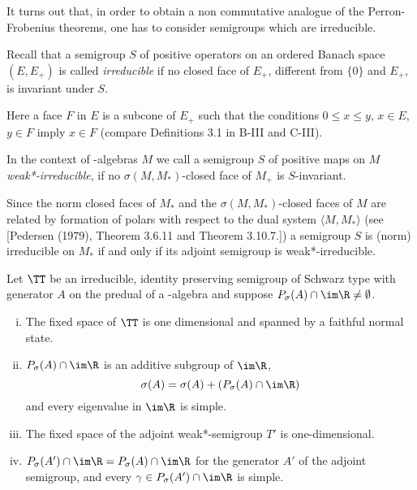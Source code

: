 It turns out that, in order to obtain a non commutative analogue of the Perron-Frobenius theorems, one has to consider semigroups which are irreducible.

Recall that a semigroup $S$ of positive operators on an ordered Banach space $(E,E_{+})$ is called \emph{irreducible} if no closed face of $E_{+}$, different from $\{0\}$ and $E_{+}$, is invariant under $S$.

Here a face $F$ in $E$ is a subcone of $E_{+}$ such that the conditions $0 \leq x \leq y$, $x \in E$, $y \in F$ imply $x \in F$ (compare Definitions 3.1 in B-III and C-III).

In the context of \WA-algebras $M$ we call a semigroup $S$ of positive maps on $M$ \emph{weak*-irreducible}, if no $\sigma(M,M_{*})$-closed face of $M_{+}$ is $S$-invariant.

Since the norm closed faces of $M_{*}$ and the $\sigma(M,M_{*})$-closed faces of $M$ are related by formation of polars with respect to the dual system $\langle M,M_{*} \rangle$ (see [Pedersen (1979), Theorem 3.6.11 and Theorem 3.10.7.]) a semigroup $S$ is (norm) irreducible on $M_{*}$ if and only if its adjoint semigroup is weak*-irreducible.

\begin{theorem}\label{thm:d3-1.10}
Let $\TT$ be an irreducible, identity preserving semigroup of Schwarz type with generator $A$ on the predual of a \WA-algebra and suppose $P_{\sigma}(A) \cap \im\R \neq \emptyset$.

\begin{enumerate}[(i)]
\item 
The fixed space of $\TT$ is one dimensional and spanned by a faithful normal state.

\item 
$P_{\sigma}(A) \cap \im\R$ is an additive subgroup of $\im\R$,
\[
\sigma(A) = \sigma(A) + (P_{\sigma}(A) \cap \im\R)
\]
and every eigenvalue in $\im\R$ is simple.

\item 
The fixed space of the adjoint weak*-semigroup $T'$ is one-dimensional.

\item 
$P_{\sigma}(A') \cap \im\R = P_{\sigma}(A) \cap \im\R$ for the generator $A'$ of the adjoint semigroup, and every $\gamma \in P_{\sigma}(A') \cap \im\R$ is simple.
\end{enumerate}
\end{theorem}

